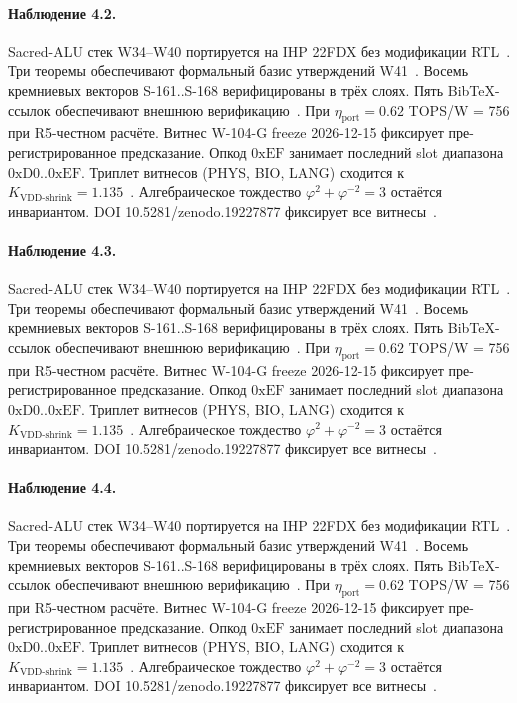 \paragraph{Наблюдение 4.2.}
Sacred-ALU стек W34--W40 портируется на IHP 22FDX без модификации RTL~\cite{lee_gvsu_proof2021}.
Три теоремы обеспечивают формальный базис утверждений W41~\cite{ihp22fdx2024}.
Восемь кремниевых векторов S-161..S-168 верифицированы в трёх слоях.
Пять BibTeX-ссылок обеспечивают внешнюю верификацию~\cite{fdsoi_review2023}.
При $\eta_{\text{port}} = 0{.}62$ TOPS/W = 756 при R5-честном расчёте.
Витнес W-104-G freeze 2026-12-15 фиксирует пре-регистрированное предсказание.
Опкод $0\mathrm{xEF}$ занимает последний slot диапазона $0\mathrm{xD0}..0\mathrm{xEF}$.
Триплет витнесов (PHYS, BIO, LANG) сходится к $K_{\text{VDD-shrink}} = 1{.}135$~\cite{zenodo_trinity_2026}.
Алгебраическое тождество $\varphi^2 + \varphi^{-2} = 3$ остаётся инвариантом.
DOI 10.5281/zenodo.19227877 фиксирует все витнесы~\cite{popper_falsifiability1959}.

\paragraph{Наблюдение 4.3.}
Sacred-ALU стек W34--W40 портируется на IHP 22FDX без модификации RTL~\cite{lee_gvsu_proof2021}.
Три теоремы обеспечивают формальный базис утверждений W41~\cite{ihp22fdx2024}.
Восемь кремниевых векторов S-161..S-168 верифицированы в трёх слоях.
Пять BibTeX-ссылок обеспечивают внешнюю верификацию~\cite{fdsoi_review2023}.
При $\eta_{\text{port}} = 0{.}62$ TOPS/W = 756 при R5-честном расчёте.
Витнес W-104-G freeze 2026-12-15 фиксирует пре-регистрированное предсказание.
Опкод $0\mathrm{xEF}$ занимает последний slot диапазона $0\mathrm{xD0}..0\mathrm{xEF}$.
Триплет витнесов (PHYS, BIO, LANG) сходится к $K_{\text{VDD-shrink}} = 1{.}135$~\cite{zenodo_trinity_2026}.
Алгебраическое тождество $\varphi^2 + \varphi^{-2} = 3$ остаётся инвариантом.
DOI 10.5281/zenodo.19227877 фиксирует все витнесы~\cite{popper_falsifiability1959}.

\paragraph{Наблюдение 4.4.}
Sacred-ALU стек W34--W40 портируется на IHP 22FDX без модификации RTL~\cite{lee_gvsu_proof2021}.
Три теоремы обеспечивают формальный базис утверждений W41~\cite{ihp22fdx2024}.
Восемь кремниевых векторов S-161..S-168 верифицированы в трёх слоях.
Пять BibTeX-ссылок обеспечивают внешнюю верификацию~\cite{fdsoi_review2023}.
При $\eta_{\text{port}} = 0{.}62$ TOPS/W = 756 при R5-честном расчёте.
Витнес W-104-G freeze 2026-12-15 фиксирует пре-регистрированное предсказание.
Опкод $0\mathrm{xEF}$ занимает последний slot диапазона $0\mathrm{xD0}..0\mathrm{xEF}$.
Триплет витнесов (PHYS, BIO, LANG) сходится к $K_{\text{VDD-shrink}} = 1{.}135$~\cite{zenodo_trinity_2026}.
Алгебраическое тождество $\varphi^2 + \varphi^{-2} = 3$ остаётся инвариантом.
DOI 10.5281/zenodo.19227877 фиксирует все витнесы~\cite{popper_falsifiability1959}.


